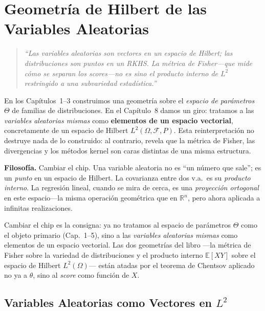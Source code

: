 
\newcommand{\nota}{\noindent\textbf{Nota:}}

\chapter{Geometría de Hilbert de las Variables Aleatorias}

\begin{quotation}
	\itshape
	``Las variables aleatorias son vectores en un espacio de Hilbert; las distribuciones son puntos en un RKHS. La métrica de Fisher---que mide cómo se separan los scores---no es sino el producto interno de $L^2$ restringido a una subvariedad estadística.''
\end{quotation}

En los Capítulos~1--3 construimos una geometría sobre el \emph{espacio de parámetros}
$\Theta$ de familias de distribuciones. En el Capítulo~8 damos un giro: tratamos
a las \emph{variables aleatorias mismas} como \textbf{elementos de un espacio
vectorial}, concretamente de un espacio de Hilbert $L^2(\Omega,\mathcal{F},P)$.
Esta reinterpretación no destruye nada de lo construido: al contrario, revela que
la métrica de Fisher, las divergencias y los métodos kernel son caras distintas de
una misma estructura.

\bigskip
\noindent
\textbf{Filosofía.} Cambiar el chip. Una variable aleatoria no es ``un número que
sale''; es un \emph{punto} en un espacio de Hilbert. La covarianza entre dos v.a.\
es su \emph{producto interno}. La regresión lineal, cuando se mira de cerca, es una
\emph{proyección ortogonal} en este espacio---la misma operación geométrica que en
$\mathbb{R}^n$, pero ahora aplicada a infinitas realizaciones.



\bigskip
\noindent
Cambiar el chip es la consigna: ya no tratamos al espacio de parámetros $\Theta$ como el objeto primario (Cap.~1--5), sino a las \emph{variables aleatorias mismas} como elementos de un espacio vectorial. Las dos geometrías del libro ---la métrica de Fisher sobre la variedad de distribuciones y el producto interno $\mathbb{E}[XY]$ sobre el espacio de Hilbert $L^2(\Omega)$--- están atadas por el teorema de Chentsov aplicado no ya a $\theta$, sino al \emph{score} como función de $X$.

\section[Variables Aleatorias como Vectores en L2]{Variables Aleatorias como Vectores en \texorpdfstring{$L^2$}{L²}}

